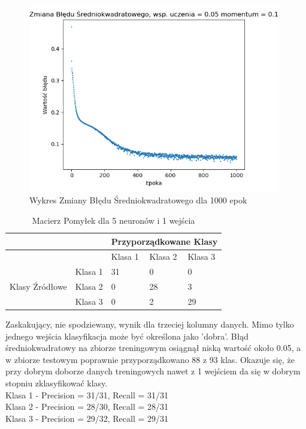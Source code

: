 \documentclass[12pt]{article}
\begin{document}
\newpage

\begin{figure}[!ht]
 \centering
 \includegraphics[width=11cm]{WykresBlad5neuron1wejscia2.png}
 \caption{Wykres Zmiany Błędu Średniokwadratowego dla 1000 epok}
 \vspace{-0.1cm}
 \label{WykresBlad19}
\end{figure}

\begin{table}
\caption{\label{tab:tablica18} Macierz Pomyłek dla 5 neuronów  i 1 wejścia}
\begin{tabular}{ |p{3cm}|p{3cm}|p{2cm}|p{2cm}|p{2cm}|  }
 \hline
 & & 
 \multicolumn{3}{|c|}{Przyporządkowane Klasy} \\
 \hline

   & & Klasa 1 & Klasa 2 & Klasa 3\\
 \hline
\multirow{3}{4em}{Klasy Źródłowe}
   & Klasa 1 & 31 & 0 & 0 \\ 
   & Klasa 2 & 0  & 28 & 3 \\
   & Klasa 3 & 0  & 2  & 29 \\
 \hline
\end{tabular}
\end{table}

Zaskakujący, nie spodziewany, wynik dla trzeciej kolumny danych. Mimo tylko jednego wejścia klasyfikacja może być określona jako 'dobra'. Błąd średniokwadratowy na zbiorze treningowym osiągnął niską wartość około 0.05, a w zbiorze testowym poprawnie przyporządkowano 88 z 93 klas. Okazuje się, że przy dobrym doborze danych treningowych nawet z 1 wejściem da się w dobrym stopniu zklasyfikować klasy.
\\Klasa 1 - Precision = 31/31, Recall = 31/31\\
Klasa 2 - Precision = 28/30, Recall = 28/31\\
Klasa 3 - Precision = 29/32, Recall = 29/31\\
\end{document}
